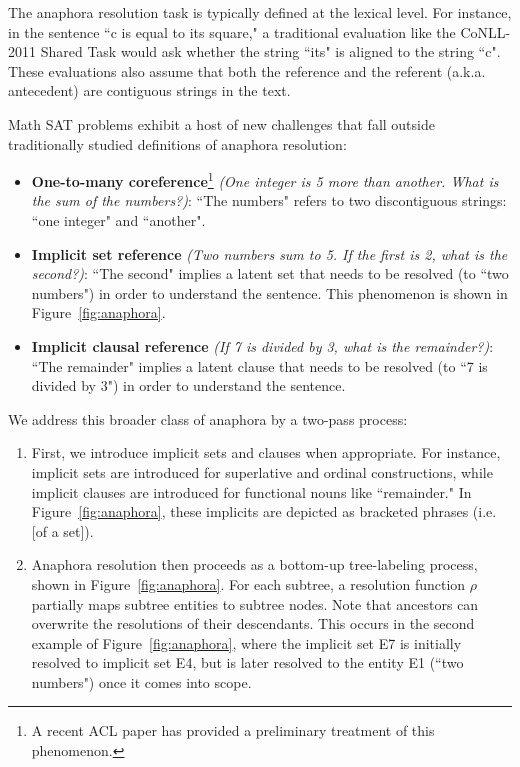 \documentclass[11pt,letterpaper]{article}
\begin{document}
The anaphora resolution task \cite{Ge1998ASA} is typically defined at the lexical level. For instance, in the sentence ``c is equal to its square," a traditional evaluation like the CoNLL-2011 Shared Task \cite{Pradhan2011CoNLL2011ST} would ask whether the string ``its" is aligned to the string ``c". These evaluations also assume that both the reference and the referent (a.k.a. antecedent) are contiguous strings in the text. 

Math SAT problems exhibit a host of new challenges that fall outside traditionally studied definitions of anaphora resolution:

\begin{itemize}
\item \textbf{One-to-many coreference}\footnote{A recent ACL paper \cite{Vala2016TheMA} has provided a preliminary treatment of this phenomenon.} \textit{(One integer is 5 more than another. What is the sum of the numbers?)}: ``The numbers" refers to two discontiguous strings: ``one integer" and ``another".
\item \textbf{Implicit set reference} \textit{(Two numbers sum to 5. If the first is 2, what is the second?)}: ``The second" implies a latent set that needs to be resolved (to ``two numbers") in order to understand the sentence. This phenomenon is shown in Figure~\ref{fig:anaphora}.
\item \textbf{Implicit clausal reference} \textit{(If 7 is divided by 3, what is the remainder?)}: ``The remainder" implies a latent clause that needs to be resolved (to ``7 is divided by 3") in order to understand the sentence.
\end{itemize}

\noindent We address this broader class of anaphora by a two-pass process:

\begin{enumerate}
\item First, we introduce implicit sets and clauses when appropriate. For instance, implicit sets are introduced for superlative and ordinal constructions, while implicit clauses are introduced for functional nouns like ``remainder." In Figure~\ref{fig:anaphora}, these implicits are depicted as bracketed phrases (i.e. [of a set]). 
\item Anaphora resolution then proceeds as a bottom-up tree-labeling process, shown in Figure~\ref{fig:anaphora}. For each subtree, a resolution function $\rho$ partially maps subtree entities to subtree nodes. Note that ancestors can overwrite the resolutions of their descendants. This occurs in the second example of Figure~\ref{fig:anaphora}, where the implicit set E7 is initially resolved to implicit set E4, but is later resolved to the entity E1 (``two numbers") once it comes into scope.  
\end{enumerate}
\end{document}
